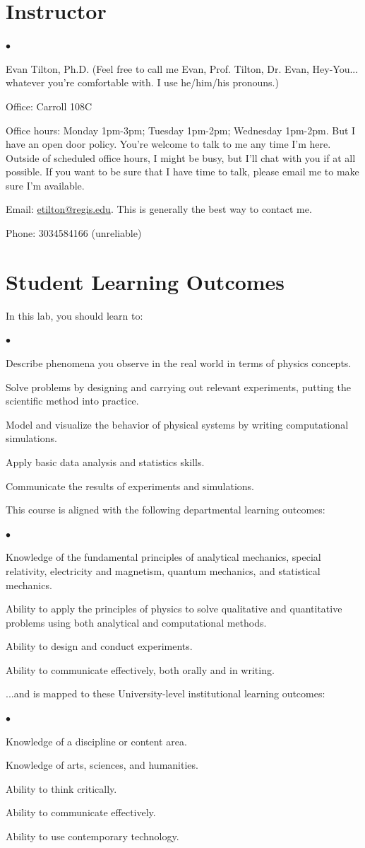 \documentclass[11pt]{article}
\newcommand{\squishlist}{
   \begin{list}{$\bullet$}
    { \setlength{\itemsep}{0pt}      \setlength{\parsep}{3pt}
      \setlength{\topsep}{3pt}       \setlength{\partopsep}{0pt}
      \setlength{\leftmargin}{1.5em} \setlength{\labelwidth}{1em}
      \setlength{\labelsep}{0.5em} } }
\newcommand{\squishend}{
    \end{list}  }
\begin{document}
\section{Instructor}
\squishlist
\item Evan Tilton, Ph.D. (Feel free to call me Evan, Prof. Tilton, Dr. Evan, Hey-You... whatever you're comfortable with. I use he/him/his pronouns.)
\item Office: Carroll 108C
\item Office hours: Monday 1pm-3pm; Tuesday 1pm-2pm; Wednesday 1pm-2pm. But I have an open door policy. You're welcome to talk to me any time I'm here. Outside of scheduled office hours, I might be busy, but I'll chat with you if at all possible. If you want to be sure that I have time to talk, please email me to make sure I'm available.
\item  Email: \url{etilton@regis.edu}.  This is generally the best way to contact me.
\item Phone: 3034584166 (unreliable)
\squishend

\section{Student Learning Outcomes}

In this lab, you should learn to:
\squishlist
\item Describe phenomena you observe in the real world in terms of physics concepts.
\item Solve problems by designing and carrying out relevant experiments, putting the scientific method into practice.
\item Model and visualize the behavior of physical systems by writing computational simulations.
\item Apply basic data analysis and statistics skills.
\item Communicate the results of experiments and simulations.
\squishend
This course is aligned with the following departmental learning outcomes:
\squishlist
\item Knowledge of the fundamental principles of analytical mechanics, special relativity, electricity and magnetism, quantum mechanics, and statistical mechanics.
\item Ability to apply the principles of physics to solve qualitative and quantitative problems using both analytical and computational methods.
\item Ability to design and conduct experiments.
\item Ability to communicate effectively, both orally and in writing.
\squishend
...and is mapped to these University-level institutional learning outcomes:
\squishlist
\item Knowledge of a discipline or content area.
\item Knowledge of arts, sciences, and humanities.
\item Ability to think critically.
\item Ability to communicate effectively.
\item Ability to use contemporary technology.
\squishend
\end{document}

